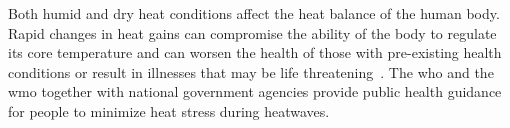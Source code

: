 Both humid and dry heat conditions affect the heat balance of the human body.
Rapid changes in heat gains can compromise the ability of the body to regulate its core temperature and can worsen the health of those with pre-existing health conditions or result in illnesses that may be life threatening~\cite{WMO2015}.
The \ac{who} and the \ac{wmo} together with national government agencies provide public health guidance for people to minimize heat stress during heatwaves.

